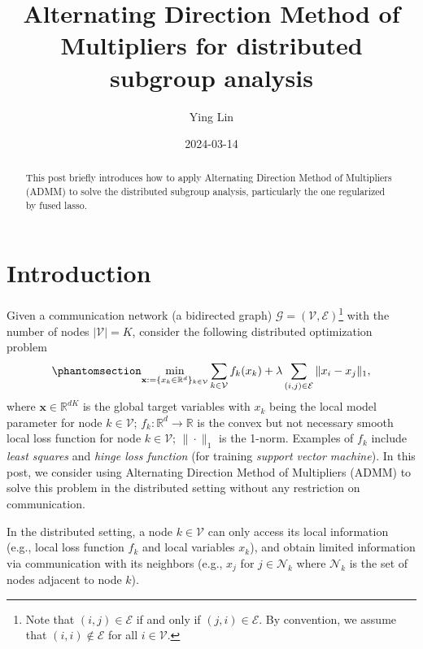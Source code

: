 \documentclass[
  letterpaper,
  DIV=11,
  numbers=noendperiod]{scrartcl}
\title{Alternating Direction Method of Multipliers for distributed
subgroup analysis}
\author{Ying Lin}
\date{2024-03-14}
\theoremstyle{plain}
\theoremstyle{remark}
\begin{document}
\maketitle
\begin{abstract}
This post briefly introduces how to apply Alternating Direction Method
of Multipliers (ADMM) to solve the distributed subgroup analysis,
particularly the one regularized by fused lasso.
\end{abstract}


\newcommand\dom{\textrm{dom}\,}

\newcommand\argmin{\operatorname*{argmin}}
\newcommand\prox{\textrm{prox}}
\allowdisplaybreaks

\section{Introduction}\label{sec-introduction}

Given a communication network (a bidirected graph)
\(\mathcal{G} = (\mathcal{V}, \mathcal{E})\)\footnote{Note that
  \((i, j) \in \mathcal{E}\) if and only if \((j, i) \in \mathcal{E}\).
  By convention, we assume that \((i, i) \notin \mathcal{E}\) for all
  \(i \in \mathcal{V}\).} with the number of nodes
\(| \mathcal{V} | = K\), consider the following distributed optimization
problem \begin{equation}\phantomsection\label{eq-opt-prob}{
\min_{\mathbf{x}:=\{x_k \in \mathbb{R}^d\}_{k\in \mathcal{V}}} \sum_{k \in \mathcal{V}} f_k(x_k) + \lambda \sum_{(i, j) \in \mathcal{E}} \| x_i - x_j \|_1,
}\end{equation} where \(\mathbf{x} \in \mathbb{R}^{dK}\) is the global
target variables with \(x_k\) being the local model parameter for node
\(k \in \mathcal{V}\); \(f_k : \mathbb{R}^d \rightarrow \mathbb{R}\) is
the convex but not necessary smooth local loss function for node
\(k \in \mathcal{V}\); \(\| \cdot \|_1\) is the 1-norm. Examples of
\(f_k\) include \emph{least squares} and \emph{hinge loss function} (for
training \emph{support vector machine}). In this post, we consider using
Alternating Direction Method of Multipliers (ADMM) to solve this problem
in the distributed setting without any restriction on communication.

In the distributed setting, a node \(k \in \mathcal{V}\) can only access
its local information (e.g., local loss function \(f_k\) and local
variables \(x_k\)), and obtain limited information via communication
with its neighbors (e.g., \(x_j\) for \(j \in \mathcal{N}_k\) where
\(\mathcal{N}_k\) is the set of nodes adjacent to node \(k\)).
\end{document}
